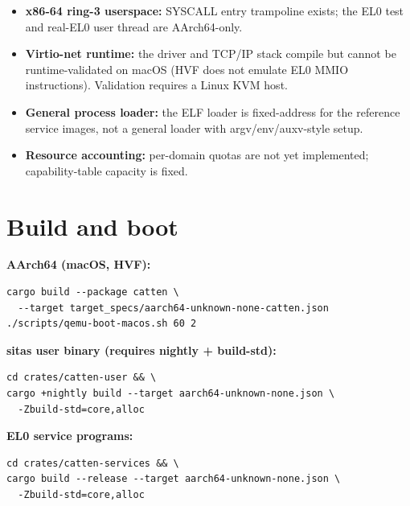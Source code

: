 \begin{itemize}
    \item \textbf{x86-64 ring-3 userspace:} SYSCALL entry trampoline exists; the
        EL0 test and real-EL0 user thread are AArch64-only.
    \item \textbf{Virtio-net runtime:} the driver and TCP/IP stack compile but
        cannot be runtime-validated on macOS (HVF does not emulate EL0 MMIO
        instructions). Validation requires a Linux KVM host.
    \item \textbf{General process loader:} the ELF loader is fixed-address for
        the reference service images, not a general loader with
        argv/env/auxv-style setup.
    \item \textbf{Resource accounting:} per-domain quotas are not yet
        implemented; capability-table capacity is fixed.
\end{itemize}

\section{Build and boot}

\textbf{AArch64 (macOS, HVF):}
\begin{verbatim}
cargo build --package catten \
  --target target_specs/aarch64-unknown-none-catten.json
./scripts/qemu-boot-macos.sh 60 2
\end{verbatim}

\textbf{sitas user binary (requires nightly + build-std):}
\begin{verbatim}
cd crates/catten-user && \
cargo +nightly build --target aarch64-unknown-none.json \
  -Zbuild-std=core,alloc
\end{verbatim}

\textbf{EL0 service programs:}
\begin{verbatim}
cd crates/catten-services && \
cargo build --release --target aarch64-unknown-none.json \
  -Zbuild-std=core,alloc
\end{verbatim}

\endinput
